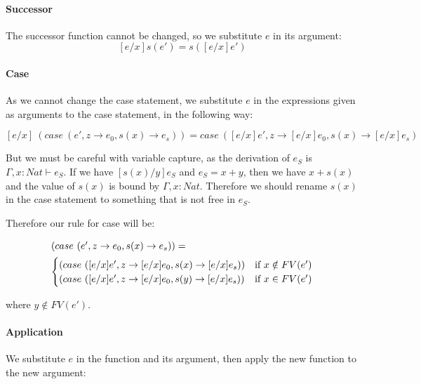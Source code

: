 \paragraph{Successor} The successor function cannot be changed, so we substitute $e$ in its argument:
 \[[e/x]s(e') = s([e/x]e')\]
 
\paragraph{Case} As we cannot change the case statement, we substitute $e$ in the expressions given as arguments to the case statement, in the following way: 

\[ [e/x] \ (case \ (e', z \to e_0, s(x) \to e_s)) = case \ ([e/x]e', z \to [e/x]e_0, s(x)  \to [e/x]e_s)\]

But we must be careful with variable capture, as the derivation of $e_S$ is $\Gamma, x:Nat \vdash e_S$. If we have $[s(x)/y] e_S$ and $e_S = x + y$, then we have $x + s(x)$ and the value of $s(x)$ is bound by $\Gamma, x : Nat$. Therefore we should rename $s(x)$ in the case statement to something that is not free in $e_S$.

Therefore our rule for case will be:

\begin{minipage}{4in}
\begin{align*}
\intertext{$(case \ (e', z \to e_0, s(x) \to e_s))=$}
  \begin{cases}
            (case \ ([e/x]e', z \to [e/x]e_0, s(x) \to [e/x]e_s)) & \text{if } x \notin FV(e')  \\
            (case \ ([e/x]e', z \to [e/x]e_0, s(y) \to [e/x]e_s)) & \text{if } x \in FV(e')
  \end{cases}
\end{align*} 
\end{minipage}

where $y \notin FV(e')$.


\paragraph{Application} We substitute $e$ in the function and its argument, then apply the new function to the new argument:

